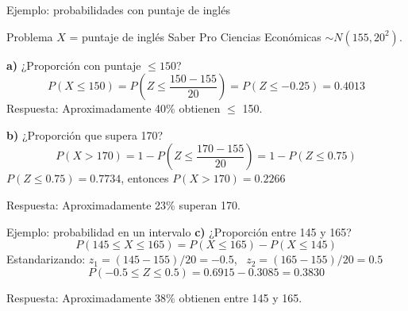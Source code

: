 \documentclass[aspectratio=169, 11pt]{beamer}
\begin{document}
\begin{frame}{Ejemplo: probabilidades con puntaje de inglés}
\begin{exampleblock}{Problema}
$X$ = puntaje de inglés Saber Pro Ciencias Econ\'omicas $\sim N(155, 20^2)$.
\end{exampleblock}

\textbf{a)} ¿Proporción con puntaje $\leq 150$?
\[
P(X \leq 150) = P\!\left(Z \leq \frac{150 - 155}{20}\right) = P(Z \leq -0.25) = 0.4013
\]
\alert{Respuesta}: Aproximadamente 40\% obtienen $\leq$ 150.

\vspace{0.3em}
\textbf{b)} ¿Proporción que supera 170?
\[
P(X > 170) = 1 - P\!\left(Z \leq \frac{170-155}{20}\right) = 1 - P(Z \leq 0.75)
\]
$P(Z \leq 0.75) = 0.7734$, entonces $P(X > 170) = 0.2266$

\alert{Respuesta}: Aproximadamente 23\% superan 170.
\end{frame}

\begin{frame}{Ejemplo: probabilidad en un intervalo}
\textbf{c)} ¿Proporción entre 145 y 165?
\[
P(145 \leq X \leq 165) = P(X \leq 165) - P(X \leq 145)
\]
Estandarizando: $z_1 = (145-155)/20 = -0.5$, \ $z_2 = (165-155)/20 = 0.5$
\[
P(-0.5 \leq Z \leq 0.5) = 0.6915 - 0.3085 = 0.3830
\]

\alert{Respuesta}: Aproximadamente 38\% obtienen entre 145 y 165.

\begin{center}
\end{center}
\end{frame}
\end{document}
